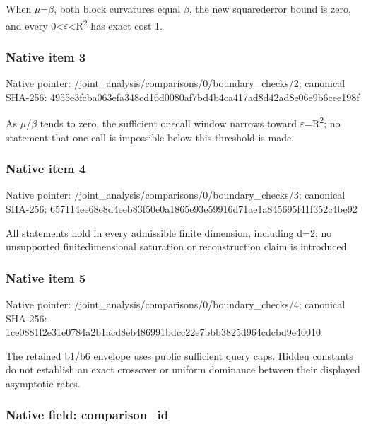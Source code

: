 \documentclass[10pt,a4paper]{article}
\begin{document}
When \ensuremath{\mu}=\ensuremath{\beta}, both block curvatures equal \ensuremath{\beta}, the new squarederror bound is zero, and every 0<\ensuremath{\varepsilon}<R\textsuperscript{2} has exact cost 1.


\subsubsection{Native item 3}


Native pointer: /joint\_analysis/comparis\allowbreak{}ons/0/boundary\_checks/2; canonical SHA-256: 4955e3fcba063efa348cd16d\allowbreak{}0080af7bd4b4ca417ad8d42a\allowbreak{}d8e06e9b6cee198f


As \ensuremath{\mu}/\ensuremath{\beta} tends to zero, the sufficient onecall window narrows toward \ensuremath{\varepsilon}=R\textsuperscript{2}; no statement that one call is impossible below this threshold is made.


\subsubsection{Native item 4}


Native pointer: /joint\_analysis/comparis\allowbreak{}ons/0/boundary\_checks/3; canonical SHA-256: 657114ee68e8d4eeb83f50e0\allowbreak{}a1865e93e59916d71ae1a845\allowbreak{}695f41f352c4be92


All statements hold in every admissible finite dimension, including d=2; no unsupported finitedimensional saturation or reconstruction claim is introduced.


\subsubsection{Native item 5}


Native pointer: /joint\_analysis/comparis\allowbreak{}ons/0/boundary\_checks/4; canonical SHA-256: 1ce0881f2e31e0784a2b1acd\allowbreak{}8eb486991bdcc22e7bbb3825\allowbreak{}d964cdcbd9e40010


The retained b1/b6 envelope uses public sufficient query caps. Hidden constants do not establish an exact crossover or uniform dominance between their displayed asymptotic rates.


\subsubsection{Native field: comparison\_id}
\end{document}
